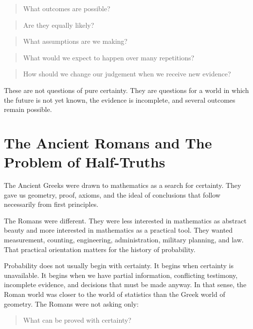 \documentclass[
  letterpaper,
  DIV=11,
  numbers=noendperiod]{scrreprt}
\begin{document}
\begin{quote}
What outcomes are possible?
\end{quote}

\begin{quote}
Are they equally likely?
\end{quote}

\begin{quote}
What assumptions are we making?
\end{quote}

\begin{quote}
What would we expect to happen over many repetitions?
\end{quote}

\begin{quote}
How should we change our judgement when we receive new evidence?
\end{quote}

These are not questions of pure certainty. They are questions for a
world in which the future is not yet known, the evidence is incomplete,
and several outcomes remain possible.

\section{The Ancient Romans and The Problem of
Half-Truths}\label{the-ancient-romans-and-the-problem-of-half-truths}

The Ancient Greeks were drawn to mathematics as a search for certainty.
They gave us geometry, proof, axioms, and the ideal of conclusions that
follow necessarily from first principles.

The Romans were different. They were less interested in mathematics as
abstract beauty and more interested in mathematics as a practical tool.
They wanted measurement, counting, engineering, administration, military
planning, and law. That practical orientation matters for the history of
probability.

Probability does not usually begin with certainty. It begins when
certainty is unavailable. It begins when we have partial information,
conflicting testimony, incomplete evidence, and decisions that must be
made anyway. In that sense, the Roman world was closer to the world of
statistics than the Greek world of geometry. The Romans were not asking
only:

\begin{quote}
What can be proved with certainty?
\end{quote}
\end{document}
